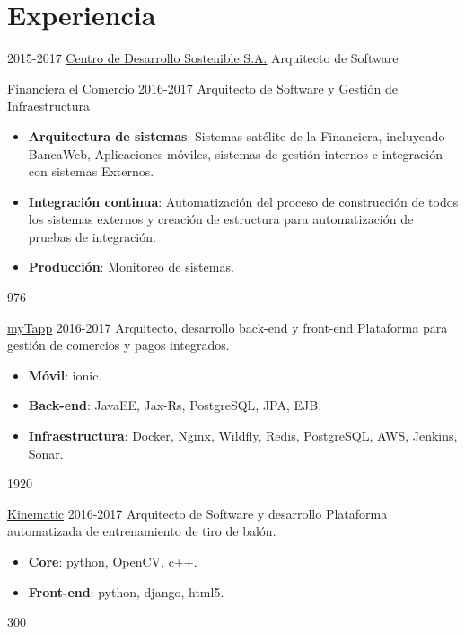 \documentclass[]{friggeri-cv}
\begin{document}
\section{Experiencia}
\begin{entrylist}
\entry
    {2015-2017}
    {\href{http://www.cds.com.py}{Centro de Desarrollo Sostenible S.A.}}
    {Arquitecto de Software}
    {\proyecto
        {Financiera el Comercio}
        {2016-2017}
        {Arquitecto de Software y Gestión de Infraestructura}
        {}
        {\begin{itemize}
            \item \textbf{Arquitectura de sistemas}: Sistemas satélite de la Financiera, incluyendo BancaWeb, Aplicaciones móviles, sistemas de gestión internos e integración con sistemas Externos.
            \item \textbf{Integración continua}: Automatización del proceso de construcción de todos los sistemas externos y creación de estructura para automatización de pruebas de integración.
            \item \textbf{Producción}: Monitoreo de sistemas.
        \end{itemize}} 
        {976}
    
    \proyecto
        {\href{https://www.mytappweb.com}{myTapp}}
        {2016-2017}
        {Arquitecto, desarrollo back-end y front-end}
        {Plataforma para gestión de comercios y pagos integrados.}
        {\begin{itemize}
            \item \textbf{Móvil}: ionic.
            \item \textbf{Back-end}: JavaEE, Jax-Rs, PostgreSQL, JPA, EJB.
            \item \textbf{Infraestructura}: Docker, Nginx, Wildfly, Redis, PostgreSQL, AWS, Jenkins, Sonar.
        \end{itemize}} 
        {1920}
        
    \proyecto
        {\href{http://www.cds.com.py/productos/kinematics/}{Kinematic}}
        {2016-2017}
        {Arquitecto de Software y desarrollo}
        {Plataforma automatizada de entrenamiento de tiro de balón.}
        {\begin{itemize}
            \item \textbf{Core}: python, OpenCV, c++.
            \item \textbf{Front-end}: python, django, html5.
        \end{itemize}}
        {300}
        
}
\end{entrylist}
\end{document}
